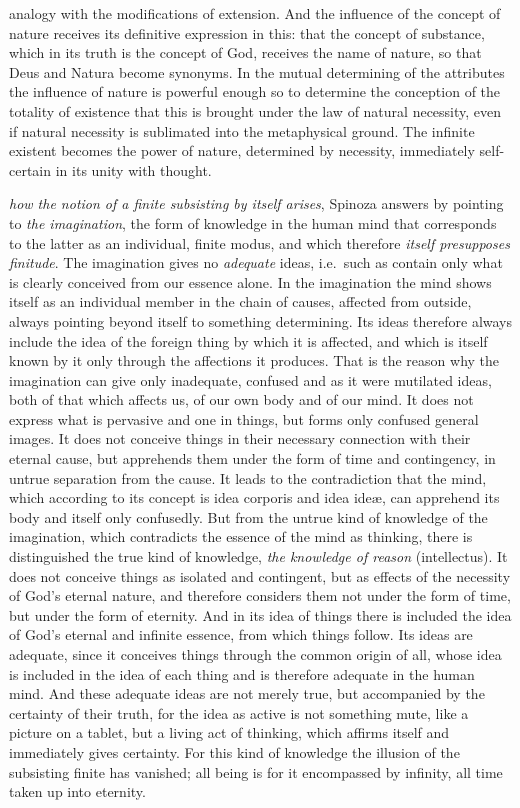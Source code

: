 analogy with the modifications of extension. And the influence of the
concept of nature receives its definitive expression in this: that the
concept of substance, which in its truth is the concept of God,
receives the name of nature, so that Deus and Natura become synonyms.
In the mutual determining of the attributes the influence of nature is
powerful enough so to determine the conception of the totality of
existence that this is brought under the law of natural necessity,
even if natural necessity is sublimated into the metaphysical ground.
The infinite existent becomes the power of nature, determined by
necessity, immediately self-certain in its unity with thought.

\divrule

\emph{how the notion of a finite subsisting by itself
arises}, Spinoza answers by pointing to \emph{the imagination}, the form
of knowledge in the human mind that corresponds to the latter as an
individual, finite modus, and which therefore \emph{itself presupposes
finitude}. The imagination gives no \emph{adequate} ideas, i.e.\ such
as contain only what is clearly conceived from our essence alone. In
the imagination the mind shows itself as an individual member in the
chain of causes, affected from outside, always pointing beyond itself
to something determining. Its ideas therefore always include the idea
of the foreign thing by which it is affected, and which is itself
known by it only through the affections it produces. That is the
reason why the imagination can give only inadequate, confused and as
it were mutilated ideas, both of that which affects us, of our own
body and of our mind. It does not express what is pervasive and one in
things, but forms only confused general images. It does not conceive
things in their necessary connection with their eternal cause, but
apprehends them under the form of time and contingency, in untrue
separation from the cause. It leads to the contradiction that the
mind, which according to its concept is idea corporis and idea ideæ,
can apprehend its body and itself only confusedly. But from the untrue
kind of knowledge of the imagination, which contradicts the essence of
the mind as thinking, there is distinguished the true kind of
knowledge, \emph{the knowledge of reason} (intellectus). It does not
conceive things as isolated and contingent, but as effects of the
necessity of God's eternal nature, and therefore considers them not
under the form of time, but under the form of eternity. And in its
idea of things there is included the idea of God's eternal and
infinite essence, from which things follow. Its ideas are adequate,
since it conceives things through the common origin of all, whose idea
is included in the idea of each thing and is therefore adequate in the
human mind. And these adequate ideas are not merely true, but
accompanied by the certainty of their truth, for the idea as active is
not something mute, like a picture on a tablet, but a living act of
thinking, which affirms itself and immediately gives
certainty. For this kind of knowledge the illusion of the subsisting
finite has vanished; all being is for it encompassed by infinity, all
time taken up into eternity.

